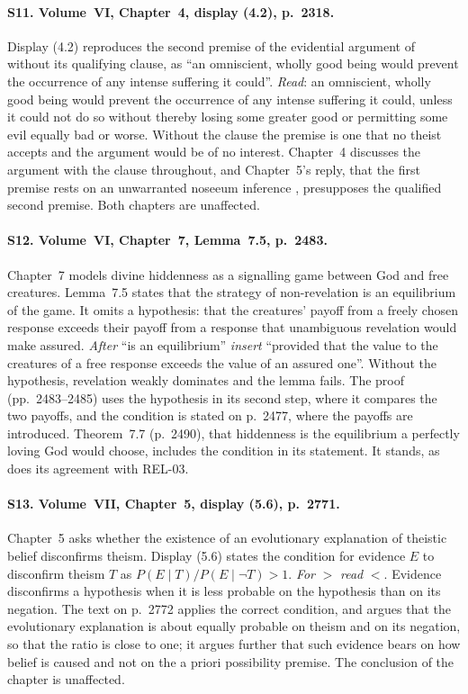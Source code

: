 \documentclass{situationist-preprint}
\begin{document}
\paragraph{S11. Volume~VI, Chapter~4, display (4.2), p.~2318.} Display (4.2) reproduces the second premise of the evidential argument of \citet{Rowe1979} without its qualifying clause, as \enquote{an omniscient, wholly good being would prevent the occurrence of any intense suffering it could}. \textit{Read}: an omniscient, wholly good being would prevent the occurrence of any intense suffering it could, unless it could not do so without thereby losing some greater good or permitting some evil equally bad or worse. Without the clause the premise is one that no theist accepts and the argument would be of no interest. Chapter~4 discusses the argument with the clause throughout, and Chapter~5's reply, that the first premise rests on an unwarranted noseeum inference \citep{Wykstra1984}, presupposes the qualified second premise. Both chapters are unaffected.

\paragraph{S12. Volume~VI, Chapter~7, Lemma~7.5, p.~2483.} Chapter~7 models divine hiddenness as a signalling game between God and free creatures. Lemma~7.5 states that the strategy of non-revelation is an equilibrium of the game. It omits a hypothesis: that the creatures' payoff from a freely chosen response exceeds their payoff from a response that unambiguous revelation would make assured. \textit{After} \enquote{is an equilibrium} \textit{insert} \enquote{provided that the value to the creatures of a free response exceeds the value of an assured one}. Without the hypothesis, revelation weakly dominates and the lemma fails. The proof (pp.~2483--2485) uses the hypothesis in its second step, where it compares the two payoffs, and the condition is stated on p.~2477, where the payoffs are introduced. Theorem~7.7 (p.~2490), that hiddenness is the equilibrium a perfectly loving God would choose, includes the condition in its statement. It stands, as does its agreement with REL-03.

\paragraph{S13. Volume~VII, Chapter~5, display (5.6), p.~2771.} Chapter~5 asks whether the existence of an evolutionary explanation of theistic belief disconfirms theism. Display (5.6) states the condition for evidence $E$ to disconfirm theism $T$ as $P(E \mid T)/P(E \mid \neg T) > 1$. \textit{For} $>$ \textit{read} $<$. Evidence disconfirms a hypothesis when it is less probable on the hypothesis than on its negation. The text on p.~2772 applies the correct condition, and argues that the evolutionary explanation is about equally probable on theism and on its negation, so that the ratio is close to one; it argues further that such evidence bears on how belief is caused and not on the a priori possibility premise. The conclusion of the chapter is unaffected.
\end{document}
